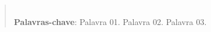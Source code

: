 

\begin{abstract}

    \lipsum[1]
    \\ \textbf{Palavras-chave}: Palavra 01. Palavra 02. Palavra 03.

\end{abstract}





